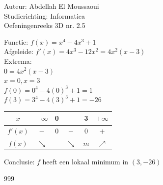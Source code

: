 \documentclass[a4paper]{article}
\begin{document}
  
\noindent \large Auteur: Abdellah El Moussaoui \\
\noindent \large Studierichting: Informatica\\
\noindent \large Oefeningenreeks 3D nr. 2.5\\

\medskip

\normalsize


Functie: $f(x) = x^4 - 4x^3 + 1$ \\

Afgeleide: $f'(x) = 4x^3 - 12x^2 = 4x^2 \left( x - 3\right)$ \\

Extrema: \\

$0 = 4x^2 \left( x - 3\right)$ \\

$x = 0, x= 3$ \\

$f(0) = 0^4 - 4\left (0 \right)^3 + 1 = 1$ \\

$f(3) = 3^4 - 4\left (3 \right)^3 + 1 = -26$ \\



\begin{tabular}{c|ccccc}
        $x$     & $-\infty$ & 0 & & 3 & $+\infty$\\ 
        \hline
        $f'(x)$ &  $-$ & $0$ & $-$ & $0$  &  $+$  \\ 
        \hline
        $f(x)$  & $\searrow$  &  &$\searrow$ & $m$& $\nearrow$\\
\end{tabular}

\bigskip

Conclusie: $f$ heeft een lokaal minimum in $(3, -26)$\\


  
    

\begin{thebibliography}{999}
\end{thebibliography}
\end{document}
